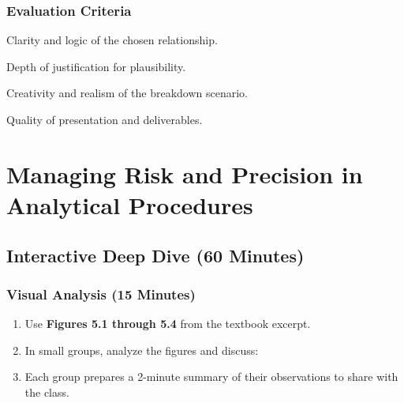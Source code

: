 \documentclass[12pt,a4paper]{memoir}
\begin{document}
\subsection*{Evaluation Criteria}
\begin{compactitem}
    \item Clarity and logic of the chosen relationship.
    \item Depth of justification for plausibility.
    \item Creativity and realism of the breakdown scenario.
    \item Quality of presentation and deliverables.
\end{compactitem}


\chapter{Managing Risk and Precision in Analytical Procedures}

\section*{Interactive Deep Dive (60 Minutes)}

\subsection*{Visual Analysis (15 Minutes)}
\begin{enumerate}
    \item Use \textbf{Figures 5.1 through 5.4} from the textbook excerpt.
    \item In small groups, analyze the figures and discuss:
    \item Each group prepares a 2-minute summary of their observations to share with the class.
\end{enumerate}
\end{document}
